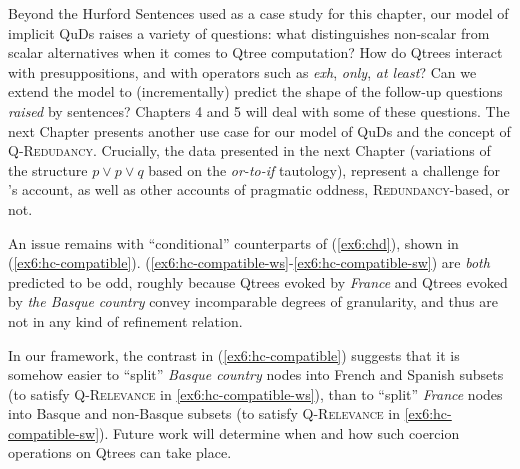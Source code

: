 Beyond the Hurford Sentences used as a case study for this chapter, our model of implicit QuDs raises a variety of questions: what distinguishes non-scalar from scalar alternatives when it comes to Qtree computation? How do Qtrees interact with presuppositions, and with operators such as \textit{exh}, \textit{only}, \textit{at least}? Can we extend the model to (incrementally) predict the shape of the follow-up questions \textit{raised} by sentences? Chapters 4 and 5 will deal with some of these questions. The next Chapter presents another use case for our model of QuDs and the concept of \textsc{Q-Redudancy}. Crucially, the data presented in the next Chapter (variations of the structure $p \vee p \vee q$ based on the \textit{or-to-if} tautology), represent a challenge for \citeauthor{Kalomoiros2024}'s account, as well as other accounts of pragmatic oddness, \textsc{Redundancy}-based, or not.

An issue remains with ``conditional'' counterparts of (\ref{ex6:chd}), shown in (\ref{ex6:hc-compatible}). (\ref{ex6:hc-compatible-ws}-\ref{ex6:hc-compatible-sw}) are \textit{both} predicted to be odd, roughly because Qtrees evoked by \textit{France} and Qtrees evoked by \textit{the Basque country} convey incomparable degrees of granularity, and thus are not in any kind of refinement relation.

\begin{exe}
	\ex \label{ex6:hc-compatible}
	\begin{xlist}
		\label{ex6:hc-compatible-ws}
		\label{ex6:hc-compatible-sw}
	\end{xlist}
\end{exe}

In our framework, the contrast in (\ref{ex6:hc-compatible}) suggests that it is somehow easier to ``split'' \textit{Basque country} nodes into French and Spanish subsets (to satisfy \textsc{Q-Relevance} in \ref{ex6:hc-compatible-ws}), than to ``split'' \textit{France} nodes into Basque and non-Basque subsets (to satisfy \textsc{Q-Relevance} in \ref{ex6:hc-compatible-sw}). Future work will determine when and how such coercion operations on Qtrees can take place.


